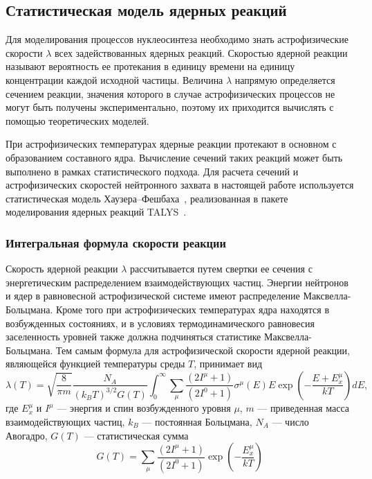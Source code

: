 \subsection{Статистическая модель ядерных реакций}
\label{sec:statmodel}
Для моделирования процессов нуклеосинтеза необходимо знать астрофизические скорости $\lambda$ всех задействованных ядерных реакций. Скоростью ядерной реакции называют вероятность ее протекания в единицу времени на единицу концентрации каждой исходной частицы. Величина $\lambda$ напрямую определяется сечением реакции, значения которого в случае астрофизических процессов не могут быть получены экспериментально, поэтому их приходится вычислять с помощью теоретических моделей.

При астрофизических температурах ядерные реакции протекают в основном с образованием составного ядра. Вычисление сечений таких реакций может быть выполнено в рамках статистического подхода. Для расчета сечений и астрофизических скоростей нейтронного захвата в настоящей работе используется статистическая модель Хаузера--Фешбаха~\cite{hauser1952}, реализованная в пакете моделирования ядерных реакций TALYS~\cite{koning2019}.

\subsubsection{Интегральная формула скорости реакции}
Скорость ядерной реакции $\lambda$ рассчитывается путем свертки ее сечения с энергетическим распределением взаимодействующих частиц. Энергии нейтронов и ядер в равновесной астрофизической системе имеют распределение Максвелла-Больцмана. Кроме того при астрофизических температурах ядра находятся в возбужденных состояниях, и в условиях термодинамического равновесия заселенность уровней также должна подчиняться статистике Максвелла-Больцмана. Тем самым формула для астрофизической скорости ядерной реакции, являющейся функцией температуры среды $T$, принимает вид
\begin{equation}
\displaystyle
\lambda(T) = \sqrt{\frac{8}{\pi m}} \frac{N_A}{(k_B T)^{3/2} G(T)} \int_0^\infty \sum_\mu \frac{(2 I^\mu + 1)}{(2 I^0 + 1)} \sigma^\mu(E) E \exp \left( - \frac{E + E_x^\mu}{kT} \right) dE,
\label{eq:rate}
\end{equation}
где $E^\mu_x$ и $I^\mu$ --- энергия и спин возбужденного уровня $\mu$, $m$ --- приведенная масса взаимодействующих частиц, $k_B$ --- постоянная Больцмана, $N_A$ --- число Авогадро, $G(T)$ --- статистическая сумма
\begin{equation}
    \displaystyle
    G(T) = \sum_\mu \frac{(2 I^\mu + 1)}{(2 I^0 + 1)} \exp \left( - \frac{E_x^\mu}{kT} \right)
\end{equation}

